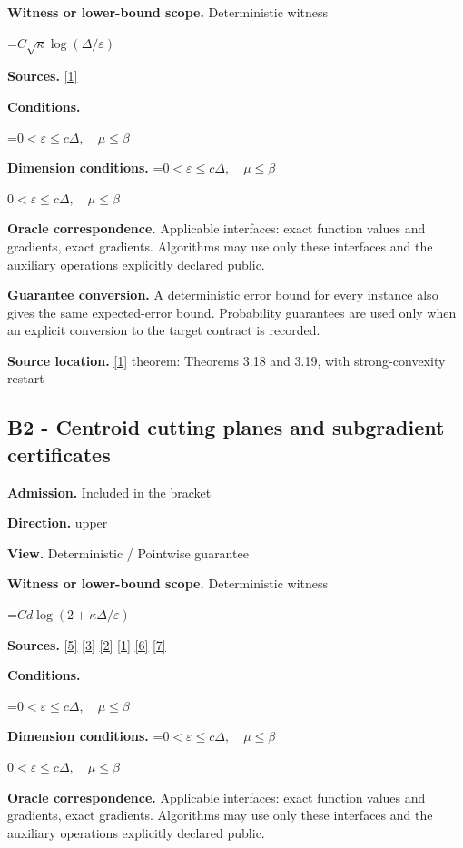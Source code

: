 \documentclass[10pt,a4paper]{article}
\newcommand{\AtlasMath}[1]{\par\begingroup\centering\setbox0=\hbox{$\displaystyle #1$}\ifdim\wd0>1.4\linewidth\typeout{ATLAS WIDE FORMULA: \the\wd0}\fi\ifdim\wd0>\linewidth\resizebox{\linewidth}{!}{\box0}\else\box0\fi\par\endgroup}
\newcommand{\AtlasInlineMath}[1]{\begingroup\setbox0=\hbox{$#1$}\ifdim\wd0>.4\linewidth\endgroup\AtlasMath{#1}\else\endgroup$#1$\fi}
\begin{document}
\textbf{Witness or lower-bound scope.} Deterministic witness

\AtlasMath{C\sqrt\kappa\log(\Delta/\varepsilon)}
\textbf{Sources.} \href{https://arxiv.org/pdf/1405.4980}{[1]}

\textbf{Conditions.} 
\AtlasMath{0<\varepsilon\le c\Delta,\quad\mu\le\beta}


\textbf{Dimension conditions.} \AtlasInlineMath{0<\varepsilon\le c\Delta,\quad\mu\le\beta}

\textbf{Oracle correspondence.} Applicable interfaces: exact function values and gradients, exact gradients. Algorithms may use only these interfaces and the auxiliary operations explicitly declared public.

\textbf{Guarantee conversion.} A deterministic error bound for every instance also gives the same expected-error bound. Probability guarantees are used only when an explicit conversion to the target contract is recorded.

\textbf{Source location.} \href{https://arxiv.org/pdf/1405.4980}{[1]} theorem: Theorems 3.18 and 3.19, with strong-convexity restart

\subsection{B2 - Centroid cutting planes and subgradient certificates}
\textbf{Admission.} Included in the bracket

\textbf{Direction.} upper

\textbf{View.} Deterministic / Pointwise guarantee

\textbf{Witness or lower-bound scope.} Deterministic witness

\AtlasMath{C d\log(2+\kappa\Delta/\varepsilon)}
\textbf{Sources.} \href{https://arxiv.org/pdf/2101.09740v2}{[5]} \href{https://arxiv.org/pdf/2609.33360v2}{[3]} \href{https://arxiv.org/pdf/2609.10874}{[2]} \href{https://arxiv.org/pdf/1405.4980}{[1]} \href{https://www2.isye.gatech.edu/~nemirovs/MOR_AccuracyCertificates.pdf}{[6]} \href{https://arxiv.org/pdf/2609.20701}{[7]}

\textbf{Conditions.} 
\AtlasMath{0<\varepsilon\le c\Delta,\quad\mu\le\beta}


\textbf{Dimension conditions.} \AtlasInlineMath{0<\varepsilon\le c\Delta,\quad\mu\le\beta}

\textbf{Oracle correspondence.} Applicable interfaces: exact function values and gradients, exact gradients. Algorithms may use only these interfaces and the auxiliary operations explicitly declared public.
\end{document}
